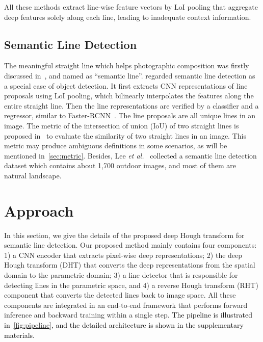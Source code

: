 \documentclass[10pt,journal,cspaper,compsoc]{IEEEtran}
\newcommand{\revise}[1]{{\textcolor{black}{#1}}}
\def\etal{\emph{et al.~}}
\begin{document}
All these methods extract line-wise feature vectors by LoI pooling that aggregate deep features solely along each line,
leading to inadequate context information.

\subsection{Semantic Line Detection}
The meaningful straight line which helps photographic composition was firstly discussed in~\cite{lee2017semantic},
and named as ``semantic line''.
%
\cite{lee2017semantic} regarded semantic line detection as a special case of object detection.
%
It first extracts CNN representations of line proposals using LoI pooling, which bilinearly interpolates the 
features along the entire straight line.
%
Then the line representations are verified by a classifier and a regressor, similar to Faster-RCNN~\cite{girshick2015fast}.
%
The line proposals are all unique lines in an image.
%
The metric of the intersection of union (IoU) of two straight lines is proposed in~\cite{lee2017semantic} to evaluate the similarity of two straight lines in an image.
%
This metric may produce ambiguous definitions in some scenarios, as will be mentioned in~\cref{sec:metric}.
%
Besides, Lee \etal \cite{lee2017semantic} collected a semantic line detection dataset which
contains about 1,700 outdoor images, and most of them are natural landscape.

\section{Approach}\label{sec:dht}
In this section, we give the details of the proposed deep Hough transform for semantic line
detection.
%
Our proposed method mainly contains four components:
1) a CNN encoder that extracts pixel-wise deep representations;
2) the deep Hough transform (DHT) that converts the deep representations from the spatial domain to the parametric domain;
3) a line detector that is responsible for detecting lines in the parametric space, and
4) a reverse Hough transform (RHT) component that converts the detected lines back to image space.
%
All these components are integrated in an end-to-end framework that performs forward inference and backward training within a single step.
\revise{The pipeline is illustrated in~\cref{fig:pipeline}, and the detailed architecture is shown in the supplementary materials.}
\end{document}
